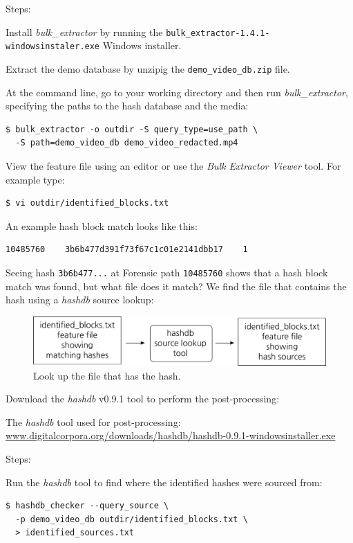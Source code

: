 \documentclass[12pt,twoside]{article}
\newcommand{\hdb}{\emph{hashdb}\xspace}
\newcommand{\bulk}{\emph{bulk\_extractor}\xspace}
\newcommand{\bev}{\emph{Bulk Extractor Viewer}\xspace}
\begin{document}
Steps:
\begin{compactenum}
\item Install \bulk by running the
\texttt{bulk\_extractor-1.4.1-windowsinstaler.exe} Windows installer.
\item Extract the demo database
by unzipig the \texttt{demo\_video\_db.zip} file.
\item At the command line, go to your working directory and then run \bulk,
specifying the paths to the hash database and the media:
\begin{verbatim}
$ bulk_extractor -o outdir -S query_type=use_path \
  -S path=demo_video_db demo_video_redacted.mp4
\end{verbatim}
\item View the feature file using an editor or use the \bev tool.
For example type:
\begin{verbatim}
$ vi outdir/identified_blocks.txt
\end{verbatim}
An example hash block match looks like this:
\begin{verbatim}
10485760    3b6b477d391f73f67c1c01e2141dbb17    1
\end{verbatim}
\end{compactenum}

Seeing hash \texttt{3b6b477...} at Forensic path \texttt{10485760}
shows that a hash block match was found, but what file does it match?
We find the file that contains the hash using a \hdb source lookup:
\begin{figure}[H]
  \center
  \includegraphics[scale=0.6]{drawings/source_lookup}
  \caption*{Look up the file that has the hash.}
  \label{fig:source_lookup}
\end{figure}

Download the \hdb v0.9.1 tool to perform the post-processing:
\begin{compactitem}
\item The \hdb tool used for post-processing:
\url{www.digitalcorpora.org/downloads/hashdb/hashdb-0.9.1-windowsinstaller.exe}
\end{compactitem}

Steps:
\begin{compactenum}
\item Run the \hdb tool to find where the identified hashes were sourced from:
\begin{verbatim}
$ hashdb_checker --query_source \
  -p demo_video_db outdir/identified_blocks.txt \
  > identified_sources.txt
\end{verbatim}
\end{compactenum}
\end{document}
